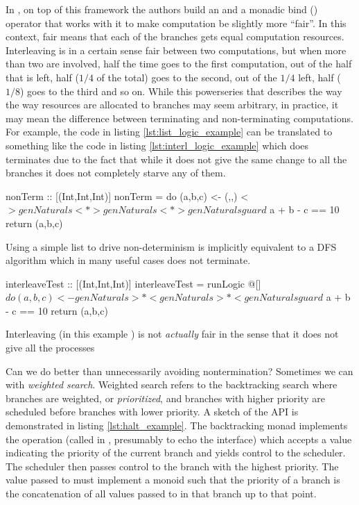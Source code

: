In \cite{kiselyovBacktrackingInterleavingTerminating}, on top of this
framework the authors build an  and a monadic bind
(\hask{>>-}) operator that works with it to make computation be
slightly more ``fair''. In this context, fair means that each of the
branches gets equal computation resources. Interleaving is in a
certain sense fair between two computations, but when more than two
are involved, half the time goes to the first computation, out of the
half that is left, half (\(1/4\) of the total) goes to the second, out
of the \(1/4\) left, half (\(1/8\)) goes to the third and so on. While
this powerseries that describes the way the way resources are
allocated to branches may seem arbitrary, in practice, it may mean the
difference between terminating and non-terminating computations. For
example, the code in listing \ref{lst:list_logic_example} can be
translated to something like the code in listing
\ref{lst:interl_logic_example} which does terminates due to the fact
that while it does not give the same change to all the branches it
does not completely starve any of them.

\begin{code}
\begin{haskellcode}
nonTerm :: [(Int,Int,Int)]
nonTerm = do
  (a,b,c) <- (,,) <$> genNaturals <*> genNaturals <*> genNaturals
  guard $ a + b - c == 10
  return (a,b,c)
\end{haskellcode}
  \caption{\label{lst:list_logic_example}Using a simple list to drive
    non-determinism is implicitly equivalent to a DFS algorithm which
    in many useful cases does not terminate.}
\end{code}

\begin{code}
\begin{haskellcode}
interleaveTest :: [(Int,Int,Int)]
interleaveTest = runLogic @[] $ do
  (a,b,c) <- genNaturals >*< genNaturals >*< genNaturals
  guard $ a + b - c == 10
  return (a,b,c)
\end{haskellcode}
  \caption{\label{lst:interl_logic_example}Interleaving (in this
    example \hask{>*<}) is not \emph{actually} fair in the sense that
    it does not give all the processes}
\end{code}

Can we do better than unnecessarily avoiding nontermination?
Sometimes we can with \emph{weighted search}. Weighted search refers
to the backtracking search where branches are weighted, or
\emph{prioritized}, and branches with higher priority are scheduled
before branches with lower priority. A sketch of the API is
demonstrated in listing \ref{lst:halt_example}. The backtracking monad
implements the  operation (called  in
\cite{kidneyAlgebrasWeightedSearch2021}, presumably to echo the
 interface) which accepts a value indicating the
priority of the current branch and yields control to the
scheduler. The scheduler then passes control to the branch with the
highest priority. The value passed to  must implement a
monoid such that the priority of a branch is the concatenation of all
values passed to  in that branch up to that point.

